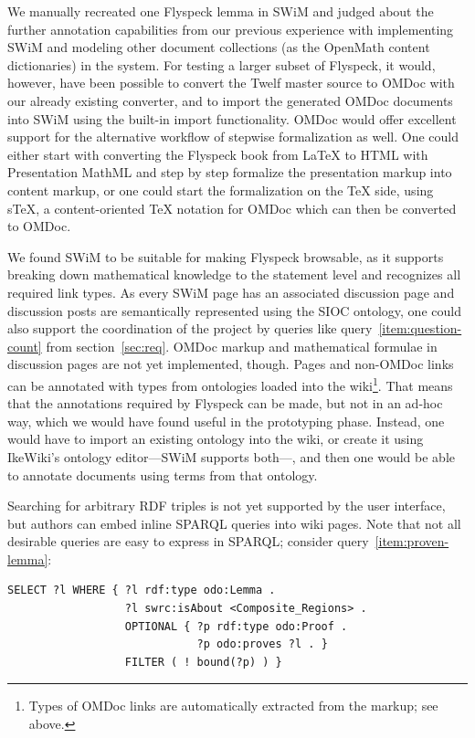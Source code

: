 We manually recreated one Flyspeck lemma in SWiM and judged about the further annotation
capabilities from our previous experience with implementing SWiM and modeling other
document collections (as the OpenMath content dictionaries) in the system. For testing a larger subset of Flyspeck, it would, however, have been possible to
convert the Twelf master source to OMDoc with our already existing converter, and to
import the generated OMDoc documents into SWiM using the built-in import functionality.
OMDoc would offer excellent support for the alternative workflow of stepwise formalization
as well\cite[chap.\ 4]{Kohlhase:omdoc1.2}.  One could either start with converting the
Flyspeck book from {\LaTeX} to HTML with Presentation MathML and step by step formalize
the presentation markup into content markup, or one could start the formalization on the
{\TeX} side, using s\TeX{}, a content-oriented {\TeX} notation for OMDoc which can then be
converted to OMDoc\cite{Kohlhase:albwo06}.

We found SWiM to be suitable for making Flyspeck browsable, as it supports breaking down
mathematical knowledge to the statement level and recognizes all required link types.  As
every SWiM page has an associated discussion page and discussion posts are semantically
represented using the SIOC ontology\cite{SIOC:web}, one could also support the
coordination of the project by queries like query~\ref{item:question-count} from
section~\ref{sec:req}.  OMDoc markup and mathematical formulae in discussion pages are not
yet implemented, though.  Pages and non-OMDoc links can be annotated with types from
ontologies loaded into the wiki\footnote{Types of OMDoc links are automatically extracted
  from the markup; see above.}.  That means that the annotations required by Flyspeck can
be made, but not in an ad-hoc way, which we would have found useful in the prototyping
phase.  Instead, one would have to import an existing ontology into the wiki, or create it
using IkeWiki's ontology editor---SWiM supports both---, and then one would be able to
annotate documents using terms from that ontology.

Searching for arbitrary RDF triples is not yet supported by the user interface,
but authors can embed inline SPARQL queries into wiki pages.  Note that not all desirable
queries are easy to express in SPARQL; consider query~\ref{item:proven-lemma}:

\begin{lstlisting}
SELECT ?l WHERE { ?l rdf:type odo:Lemma .
                  ?l swrc:isAbout <Composite_Regions> .
                  OPTIONAL { ?p rdf:type odo:Proof .
                             ?p odo:proves ?l . }
                  FILTER ( ! bound(?p) ) }
\end{lstlisting}

